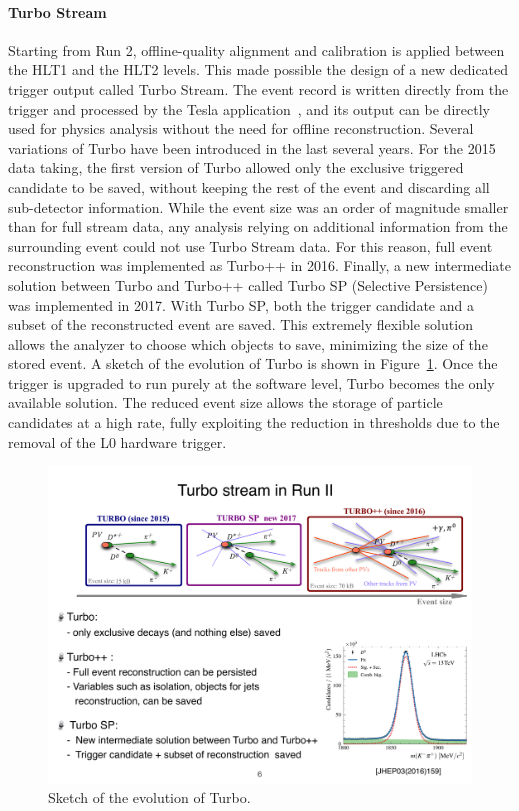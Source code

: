 \paragraph{Turbo Stream}
Starting from Run 2, offline-quality alignment and calibration is applied between the HLT1 and the HLT2 levels. This made possible the design of a new dedicated
trigger output called Turbo Stream. The event record is written directly from the trigger and processed by the Tesla application~\cite{Aaij:2016rxn}, and its output can be directly used for physics analysis without the need for offline reconstruction.
Several variations of Turbo have been introduced in the last several years. For the 2015 data taking, the first version of Turbo allowed only the exclusive triggered candidate to be saved, without keeping the rest of the event and discarding all sub-detector information. 
While the event size was an order of magnitude smaller than for full stream data, any analysis relying on additional information from the surrounding event could not use Turbo Stream data. 
For this reason, full event reconstruction was implemented as Turbo++ in 2016. Finally, a new intermediate solution between Turbo and Turbo++ called Turbo SP (Selective Persistence) was implemented in 2017. With Turbo SP, both the trigger candidate and a subset of the reconstructed event are saved. This extremely flexible solution allows the analyzer to choose which objects to save, minimizing the size of the stored event. A sketch of the evolution of Turbo is shown in Figure~\ref{fig:turbo}.
Once the trigger is upgraded to run purely at the software level, Turbo becomes the only available solution. The reduced event size allows the storage of particle candidates at a high rate, fully exploiting the reduction in \pt thresholds due to the removal of the L0 hardware trigger.  




\begin{figure}[t]
\centerline{\includegraphics[width=1.05\textwidth]{figures/Turbo.pdf}}
  \caption{Sketch of the evolution of Turbo.}
  \label{fig:turbo}
\end{figure}




